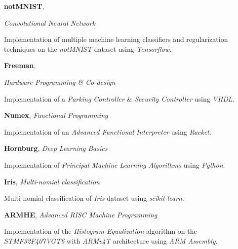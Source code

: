 \documentclass[margin, 10pt]{res} %
\begin{document}
\textbf{notMNIST}, 
{\textit{Convolutional Neural Network}
	\begin{innerlist}
		\item Implementation of multiple machine learning classifiers and regularization techniques on the \textit{notMNIST} dataset using \textit{Tensorflow}. \href{https://github.com/aligholamee/notMNIST}{\UrlFont[code]}
	\end{innerlist}

	\textbf{Freeman}, 
	{\textit{Hardware Programming \& Co-design}
		\begin{innerlist}
			\item Implementation of a \textit{Parking Controller} \& \textit{Security Controller} using \textit{VHDL}. \href{https://github.com/aligholamee/Freeman}{\UrlFont[code]}
		\end{innerlist}
		
		\textbf{Numex}, 
		\textit{Functional Programming}
		\begin{innerlist}
			\item Implementation of an \textit{Advanced Functional Interpreter} using \textit{Racket}. \href{https://github.com/aligholamee/NUMEX}{\UrlFont[code]}
		\end{innerlist}
		
		\textbf{Hornburg}, 
		\textit{Deep Learning Basics}
		\begin{innerlist}
			\item Implementation of \textit{Principal Machine Learning Algorithms} using \textit{Python}. \href{https://github.com/aligholamee/Hornburg}{\UrlFont[code]}
		\end{innerlist}
		
		\textbf{Iris}, 
		\textit{Multi-nomial classification}
		\begin{innerlist}
			\item Multi-nomial classification of \textit{Iris} dataset using \textit{scikit-learn}. \href{https://github.com/aligholamee/IRIS}{\UrlFont[code]}
		\end{innerlist}
	
		\textbf{ARMHE}, 
		\textit{Advanced RISC Machine Programming}
		\begin{innerlist}
			\item Implementation of the \textit{Histogram Equalization} algorithm on the \textit{STMF32F407VGT6} with \textit{ARMv4T} architecture using \textit{ARM Assembly}. \href{https://github.com/aligholamee/ARMHE}{\UrlFont[code]}
		\end{innerlist}

}}
\end{document}

